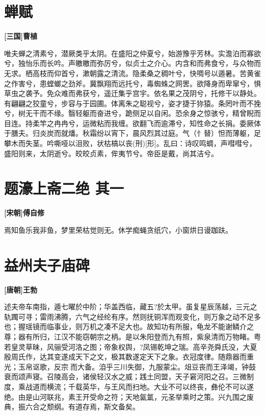 \documentclass[UTF8,titlepage,oneside]{ctexbook}
\begin{document}
\chapter*{蝉赋}
\begin{center}
	\textbf{[三国]曹植}
\end{center}

唯夫蝉之清素兮，潜厥类乎太阴。在盛阳之仲夏兮，始游豫乎芳林。实澹泊而寡欲兮，独怡乐而长吟。声皦皦而弥厉兮，似贞士之介心。内含和而弗食兮，与众物而无求。栖高枝而仰首兮，漱朝露之清流。隐柔桑之稠叶兮，快啁号以遁暑。苦黄雀之作害兮，患螳螂之劲斧。冀飘翔而远托兮，毒蜘蛛之网罟。欲降身而卑窜兮，惧草虫之袭予。免众难而弗获兮，遥迁集乎宫宇。依名果之茂阴兮，托修干以静处。有翩翩之狡童兮，步容与于园圃。体离朱之聪视兮，姿才捷于狝猿。条罔叶而不挽兮，树无干而不缘。翳轻躯而奋进兮，跪侧足以自闲。恐余身之惊骇兮，精曾睨而目连。持柔竿之冉冉兮，运微粘而我缠。欲翻飞而逾滞兮，知性命之长捐。委厥体于膳夫。归炎炭而就燔。秋霜纷以宵下，晨风烈其过庭。气（忄替）怛而薄躯，足攀木而失茎。吟嘶哑以沮败，状枯槁以丧(刑)[形]。乱曰：诗叹鸣蜩，声嘒嘒兮，盛阳则来，太阴逝兮。皎皎贞素，侔夷节兮。帝臣是戴，尚其洁兮。


\chapter*{题濠上斋二绝 其一}
\begin{center}
	\textbf{[宋朝]傅自修}
\end{center}


焉知鱼乐我非鱼，梦里荣枯觉则无。休学痴蝇贪纸穴，小窗烘日谩跏趺。



\chapter*{益州夫子庙碑}
\begin{center}
	\textbf{[唐朝]王勃}
\end{center}


述夫帝车南指，遁七曜於中阶；华盖西临，藏五?於太甲。虽复星辰荡越，三元之轨躅可寻；雷雨沸腾，六气之经纶有序。然则抚铜浑而观变化，则万象之动不足多也；握瑶镜而临事业，则万机之凑不足大也。故知功有所服，龟龙不能谢鳞介之尊；器有所归，江汉不能窃朝宗之柄。是以朱阳登而九有照，紫泉清而万物睹。粤若皇灵草昧，风骊受河洛之图；帝象权舆，?凤锡乾坤之瑞。高辛尧舜氏没，大夏殷周氏作，达其变遂成天下之文，极其数遂定天下之象。衣冠度律。随鼎器而重光；玉帛讴歌，反宗而大备。洎乎三川失御，九服蒙尘。俎豆丧而王泽竭，钟鼓衰而颂声寝。召陵高会，诸侯轻汉水之威；践土同盟，天子窘河阳之召。三微制度，乘战道而横流；千载英华，与王风而扫地。大业不可以终丧，彝伦不可以遂绝。由是山河联兆，素王开受命之符；天地氤氲，元圣举乘时之策。兴九围之废典，振六合之颓纲。有道存焉，斯文备矣。
\end{document}
